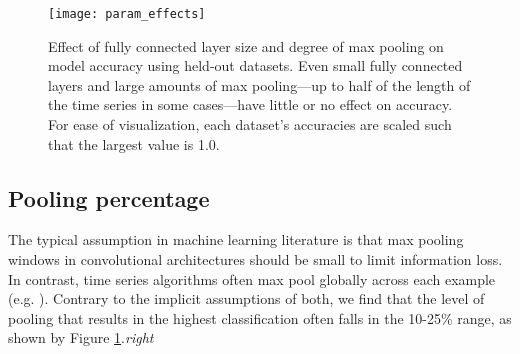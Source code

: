 \begin{figure}[h]
\begin{center}
\texttt{[image: param\_effects]}
\vspace*{-5mm}
\caption{Effect of fully connected layer size and degree of max pooling on model accuracy using held-out datasets. Even small fully connected layers and large amounts of max pooling---up to half of the length of the time series in some cases---have little or no effect on accuracy. For ease of visualization, each dataset's accuracies are scaled such that the largest value is 1.0.}
\label{fig:params}
\end{center}
\end{figure}

\subsection{Pooling percentage}

The typical assumption in machine learning literature is that max pooling windows in convolutional architectures should be small to limit information loss. In contrast, time series algorithms often max pool globally across each example (e.g. \citep{learningShapelets}). Contrary to the implicit assumptions of both, we find that the level of pooling that results in the highest classification often falls in the 10-25\% range, as shown by Figure \ref{fig:params}.\textit{right} %



